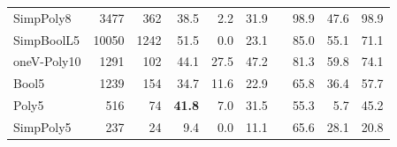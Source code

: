 \begin{table}[t]
\begin{tabular}{l r r rrr r rrr}
SimpPoly8    &   3477 &   362 & 38.5 &  2.2 & 31.9 & & 98.9 & 47.6 &  98.9 \\
SimpBoolL5   &  10050 &  1242 & 51.5 &  0.0 & 23.1 & & 85.0 & 55.1 &  71.1 \\
oneV-Poly10  &   1291 &   102 & 44.1 & 27.5 & 47.2 & & 81.3 & 59.8 &  74.1 \\
Bool5        &   1239 &   154 & 34.7 & 11.6 & 22.9 & & 65.8 & 36.4 &  57.7 \\
Poly5        &    516 &    74 & \textbf{41.8} &  7.0 & 31.5 & & 55.3 &  5.7 &  45.2 \\
SimpPoly5    &    237 &    24 &  9.4 &  0.0 & 11.1 & & 65.6 & 28.1 &  20.8 \\
\bottomrule
\end{tabular}
\end{table}
